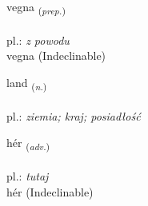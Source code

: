\documentclass[frontgrid, backgrid]{flacards}\usepackage[]{graphicx}\usepackage[]{xcolor}
\begin{document}
{vegna \small{\textsubscript{(\textit{prep.})}} \\[1ex]
\textphonetic{[vɛkna]} \\
pl.: \emph{z powodu} \\  [2ex]
vegna (Indeclinable)}

\renewcommand{\flhead}{\vskip5pt \fboxsep=0pt {\small\bfseries\footnotesize Nafnorð | Noun}}
\renewcommand{\fcfoot}{\vskip5pt \fboxsep=0pt \hspace{2pt}{\small\bfseries\footnotesize 1K}}

\renewcommand{\blhead}{\vskip5pt {\small\bfseries\footnotesize Nafnorð | Noun }}
\renewcommand{\bcfoot}{\vskip5pt \hspace{2pt}{\small\bfseries\footnotesize 1K}}


{land \small{\textsubscript{(\textit{n.})}} \\[1ex] %
\textphonetic{[lant]} \\
pl.: \emph{ziemia; kraj; posiadłość} \\  [2ex]
\renewcommand*{\arraystretch}{0.8}
}


\renewcommand{\flhead}{\vskip5pt \fboxsep=0pt {\small\bfseries\footnotesize Atviksorð | Adverb}}
\renewcommand{\fcfoot}{\vskip5pt \fboxsep=0pt \hspace{2pt}{\small\bfseries\footnotesize 1K}}

\renewcommand{\blhead}{\vskip5pt {\small\bfseries\footnotesize Atviksorð | Adverb }}
\renewcommand{\bcfoot}{\vskip5pt \hspace{2pt}{\small\bfseries\footnotesize 1K}}


{hér \small{\textsubscript{(\textit{adv.})}} \\[1ex]
\textphonetic{[çɛːr]} \\
pl.: \emph{tutaj} \\  [2ex]
hér (Indeclinable)}
\end{document}
